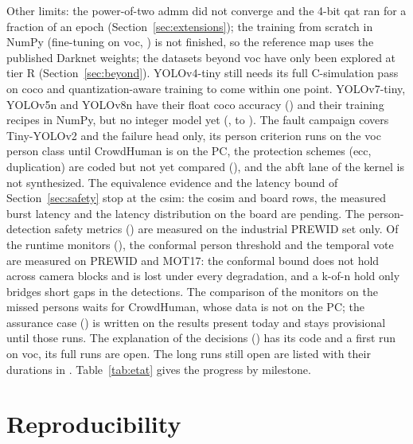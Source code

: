 \documentclass[11pt,a4paper]{article}
\begin{document}
Other limits: the power-of-two \gls{admm} did not converge and the 4-bit \gls{qat} ran for a fraction
of an epoch (Section~\ref{sec:extensions}); the training from scratch in NumPy
(fine-tuning on \gls{voc}, ) is not finished, so the reference \gls{map} uses the published Darknet
weights; the datasets beyond \gls{voc} have only been explored at \gls{tier} R
(Section~\ref{sec:beyond}). YOLOv4-tiny still needs its full C-simulation pass on \gls{coco} and
quantization-aware training to come within one point. YOLOv7-tiny, YOLOv5n and YOLOv8n
have their float \gls{coco} accuracy () and their training recipes
in NumPy, but no integer model yet (,  to ). The fault campaign covers
Tiny-YOLOv2 and the failure head only, its person criterion runs on the \gls{voc} person class
until CrowdHuman is on the PC, the protection schemes (\gls{ecc}, duplication) are coded but
not yet compared (), and the \gls{abft} lane of the kernel is not synthesized. The equivalence evidence and the
latency bound of Section~\ref{sec:safety} stop at the \gls{csim}: the \gls{cosim} and
board rows, the measured \gls{burst} latency and the latency distribution on the board are
pending. The person-detection safety metrics () are measured on the industrial
PREWID set only. Of the runtime monitors (), the conformal person threshold and the
temporal vote are measured on PREWID and MOT17: the conformal bound does not hold across
camera blocks and is lost under every degradation, and a k-of-n hold only bridges short
gaps in the detections. The comparison of the monitors on the missed persons waits for
CrowdHuman, whose data is not on the PC; the assurance case () is written on the results present today and
stays provisional until those runs. The explanation of the decisions () has its code
and a first run on \gls{voc}, its full runs are open. The long runs still open are listed with their durations in
. Table~\ref{tab:etat} gives the progress by milestone.

\begin{table}[htbp]
\caption{Progress by milestone ().}
\label{tab:etat}
\centering\small\articleetat
\end{table}

\section{Reproducibility}\label{sec:repro}
\end{document}

